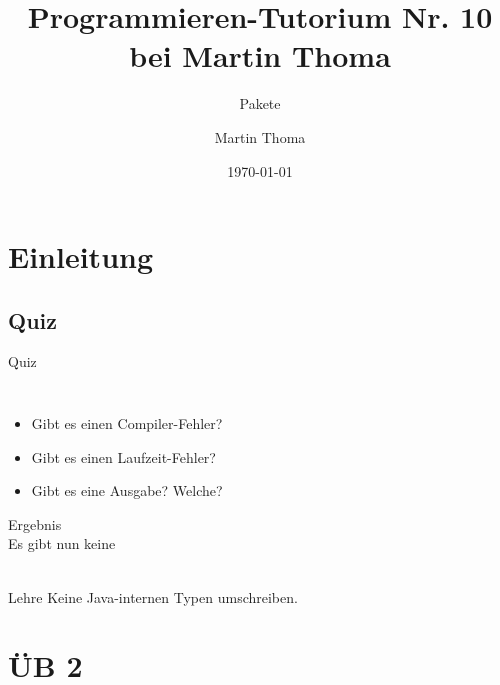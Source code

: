 \documentclass[usepdftitle=false,hyperref={pdfpagelabels=false}]{beamer}
\institute{Fakultät für Informatik}
\newcommand\tutor{Martin Thoma}
\newcommand\tutNR{10}
\newcommand\titleText{Programmieren-Tutorium Nr. \tutNR{} bei \tutor}
\begin{document}
\title{\titleText}
\subtitle{Pakete}
\author{\tutor}
\date{\today}
\subject{Programmieren}

\frame{\titlepage}


\section{Einleitung}
\subsection{Quiz}
\begin{frame}{Quiz}
    \begin{minipage}[b]{0.45\linewidth}
        \inputminted[linenos=false, numbersep=5pt, tabsize=4, fontsize=\tiny, label=String.java, frame=lines]{java}{String.java}
    \end{minipage}
    \hspace{0.5cm}
    \begin{minipage}[b]{0.45\linewidth}
        \inputminted[linenos=false, numbersep=5pt, tabsize=4, fontsize=\tiny, label=World.java, frame=lines]{java}{World.java}
    \end{minipage}
    \begin{itemize}
        \item Gibt es einen Compiler-Fehler?
        \item Gibt es einen Laufzeit-Fehler?
        \item Gibt es eine Ausgabe? Welche?
    \end{itemize}
\end{frame}

\begin{frame}{Ergebnis}
    \\
    Es gibt nun keine \\
    \\
    \begin{block}{Lehre}
        Keine Java-internen Typen umschreiben.
    \end{block}
\end{frame}


\section{ÜB 2}
\end{document}
